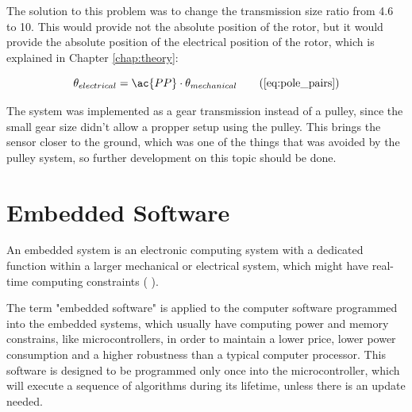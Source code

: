 The solution to this problem was to change the transmission size ratio from 4.6 to 10. This would provide not the absolute position of the rotor, but it would provide the absolute position of the electrical position of the rotor, which is explained in Chapter \ref{chap:theory}:

\begin{equation}
	\theta_{electrical} = \ac{PP} \cdot \theta_{mechanical} \tag{\ref{eq:pole_pairs}}
\end{equation}

The system was implemented as a gear transmission instead of a pulley, since the small gear size didn't allow a propper setup using the pulley. This brings the sensor closer to the ground, which was one of the things that was avoided by the pulley system, so further development on this topic should be done.



\clearpage
\section{Embedded Software}\label{sec:software}

An embedded system is an electronic computing system with a dedicated function within a larger mechanical or electrical system, which might have real-time computing constraints (\citeauthor{embeddedSystemsDesign} \citeyear{embeddedSystemsDesign}).

The term "embedded software" is applied to the computer software programmed into the embedded systems, which usually have computing power and memory constrains, like microcontrollers, in order to maintain a lower price, lower power consumption and a higher robustness than a typical computer processor. This software is designed to be programmed only once into the microcontroller, which will execute a sequence of algorithms during its lifetime, unless there is an update needed.

